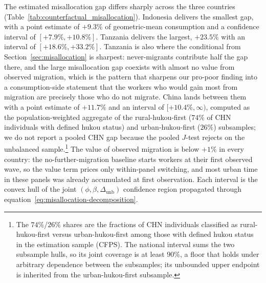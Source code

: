 The estimated misallocation gap differs sharply across the three countries (Table~\ref{tab:counterfactual_misallocation}).
Indonesia delivers the smallest gap, with a point estimate of $+9.3\%$ of geometric-mean consumption and a confidence interval of $[+7.9\%, +10.8\%]$.
Tanzania delivers the largest, $+23.5\%$ with an interval of $[+18.6\%, +33.2\%]$.
Tanzania is also where the conditional from Section~\ref{sec:misallocation} is sharpest: never-migrants contribute half the gap there, and the large misallocation gap coexists with almost no value from observed migration, which is the pattern that sharpens our pro-poor finding into a consumption-side statement that the workers who would gain most from migration are precisely those who do not migrate.
China lands between them with a point estimate of $+11.7\%$ and an interval of $[+10.4\%, \infty)$, computed as the population-weighted aggregate of the rural-hukou-first ($74\%$ of CHN individuals with defined hukou status) and urban-hukou-first ($26\%$) subsamples; we do not report a pooled CHN gap because the pooled $J$-test rejects on the unbalanced sample.\footnote{The $74\%$/$26\%$ shares are the fractions of CHN individuals classified as rural-hukou-first versus urban-hukou-first among those with defined hukou status in the estimation sample (CFPS). The national interval sums the two subsample hulls, so its joint coverage is at least $90\%$, a floor that holds under arbitrary dependence between the subsamples; its unbounded upper endpoint is inherited from the urban-hukou-first subsample.}
The value of observed migration is below $+1\%$ in every country: the no-further-migration baseline starts workers at their first observed wave, so the value term prices only within-panel switching, and most urban time in these panels was already accumulated at first observation.
Each interval is the convex hull of the joint $(\phi, \beta, \Delta_{\text{unb}})$ confidence region propagated through equation~\eqref{eq:misallocation-decomposition}.


